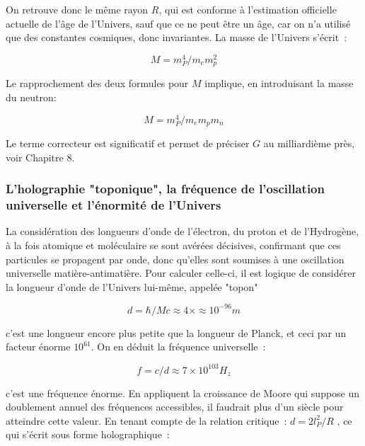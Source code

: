 \documentclass[a4paper,12pt]{article}
\begin{document}
On retrouve donc le même rayon $R$, qui est conforme à l'estimation officielle actuelle de l'âge de l'Univers, sauf que ce ne peut être un âge, car on n'a utilisé que des constantes cosmiques, donc invariantes. La masse de l'Univers s'écrit :

\begin{equation}
M = m_P^4/m_em_p^2
\end{equation}

Le rapprochement des deux formules pour $M$ implique, en introduisant la masse du neutron:

\begin{equation}
M = m_P^4/m_em_pm_n
\end{equation}

 
Le terme correcteur est significatif et permet de préciser $G$ au milliardième près, voir Chapitre 8.
 


\subsubsection {L'holographie "toponique", la fréquence de l'oscillation universelle et l'énormité de l'Univers}

       La considération des longueurs d'onde de l'électron, du proton et de l'Hydrogène, à la fois atomique et moléculaire se sont avérées décisives, confirmant que ces particules se propagent par onde, donc qu'elles sont soumises à une oscillation universelle matière-antimatière. Pour calculer celle-ci, il est logique de considérer la longueur d'onde de l'Univers lui-même, appelée "topon" 


\begin{equation}
d = \hbar/Mc  \approx 4\times \approx 10^{-96} m 
\end{equation}


c'est une longueur encore plus petite que la longueur de Planck, et ceci par un facteur énorme $10^{61}$. On en déduit la fréquence universelle : 


\begin{equation}
f = c/d \approx  7 \times 10^{103} H_z
\end{equation}

c'est une fréquence énorme. En appliquent la croissance de Moore qui suppose un doublement annuel des fréquences accessibles, il faudrait plus d'un siècle pour atteindre cette valeur.
     En tenant compte de la relation critique : $d = 2l_P^2/R$ , ce qui s'écrit sous forme holographique :
\end{document}
